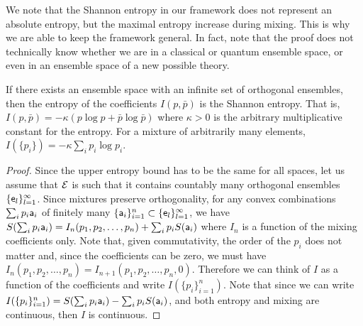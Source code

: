 We note that the Shannon entropy in our framework does not represent an absolute entropy, but the maximal entropy increase during mixing. This is why we are able to keep the framework general. In fact, note that the proof does not technically know whether we are in a classical or quantum ensemble space, or even in an ensemble space of a new possible theory.

\begin{mathSection}
\begin{thrm}\label{pm-es-entropyUnique}
	If there exists an ensemble space with an infinite set of orthogonal ensembles, then the entropy of the coefficients $I(p,\bar{p})$ is the Shannon entropy. That is, $I(p,\bar{p}) = - \kappa \left(p \log p + \bar{p} \log \bar{p}\right)$ where $\kappa>0$ is the arbitrary multiplicative constant for the entropy. For a mixture of arbitrarily many elements, $I(\{p_i\}) = - \kappa \sum_i p_i \log p_i$.
\end{thrm}

\begin{proof}
	Since the upper entropy bound has to be the same for all spaces, let us assume that $\Ens$ is such that it contains countably many orthogonal ensembles $\{\ens_l\}_{l=1}^{\infty}$. Since mixtures preserve orthogonality, for any convex combinations $\sum_i p_i \ens[a]_i$ of finitely many $\{\ens[a]_i\}_{i=1}^{n} \subset \{\ens_l\}_{l=1}^{\infty}$,  we have $S(\sum_i p_i \ens[a]_i ) = I_n(p_1, p_2, \dots, p_n) + \sum_i p_i S(\ens[a]_i)$ where $I_n$ is a function of the mixing coefficients only. Note that, given commutativity, the order of the $p_i$ does not matter and, since the coefficients can be zero, we must have $I_n(p_1, p_2, \dots, p_n) = I_{n+1}(p_1, p_2, \dots, p_n, 0)$. Therefore we can think of $I$ as a function of the coefficients and write $I(\{p_i\}_{i=1}^{n})$. Note that since we can write $I(\{p_i\}_{i=1}^{n}) = S(\sum_i p_i \ens[a]_i ) - \sum_i p_i S(\ens[a]_i)$, and both entropy and mixing are continuous, then $I$ is continuous.
	

\end{proof}
\end{mathSection}
